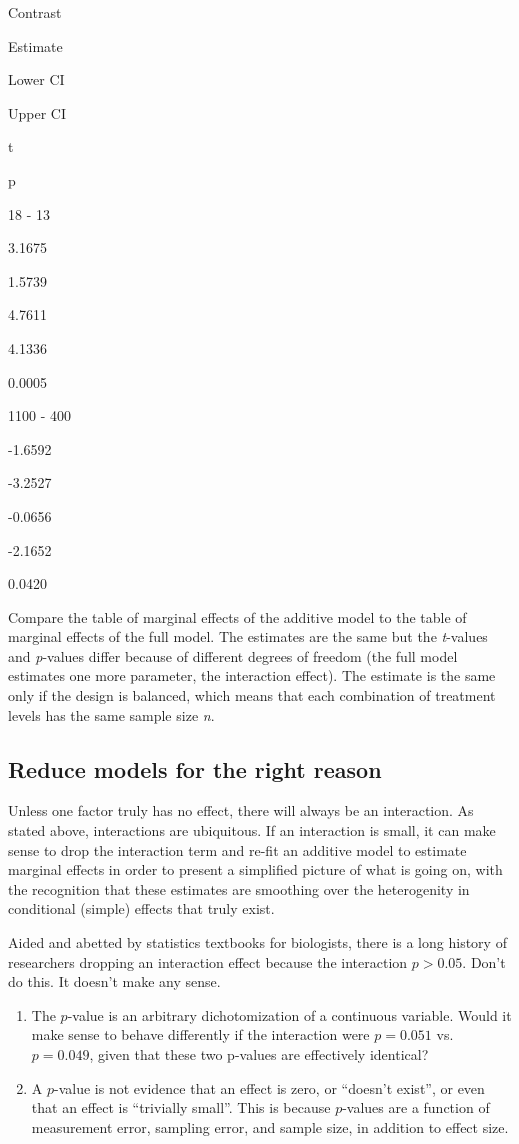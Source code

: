 \documentclass[]{book}
\providecommand{\tightlist}{%
  \setlength{\itemsep}{0pt}\setlength{\parskip}{0pt}}
\begin{document}
Contrast

Estimate

Lower CI

Upper CI

t

p

18 - 13

3.1675

1.5739

4.7611

4.1336

0.0005

1100 - 400

-1.6592

-3.2527

-0.0656

-2.1652

0.0420

Compare the table of marginal effects of the additive model to the table
of marginal effects of the full model. The estimates are the same but
the \emph{t}-values and \emph{p}-values differ because of different
degrees of freedom (the full model estimates one more parameter, the
interaction effect). The estimate is the same only if the design is
balanced, which means that each combination of treatment levels has the
same sample size \emph{n}.

\subsection{Reduce models for the right
reason}\label{reduce-models-for-the-right-reason}

Unless one factor truly has no effect, there will always be an
interaction. As stated above, interactions are ubiquitous. If an
interaction is small, it can make sense to drop the interaction term and
re-fit an additive model to estimate marginal effects in order to
present a simplified picture of what is going on, with the recognition
that these estimates are smoothing over the heterogenity in conditional
(simple) effects that truly exist.

Aided and abetted by statistics textbooks for biologists, there is a
long history of researchers dropping an interaction effect because the
interaction \(p>0.05\). Don't do this. It doesn't make any sense.

\begin{enumerate}
\def\labelenumi{\arabic{enumi}.}
\tightlist
\item
  The \(p\)-value is an arbitrary dichotomization of a continuous
  variable. Would it make sense to behave differently if the interaction
  were \(p=0.051\) vs. \(p=0.049\), given that these two p-values are
  effectively identical?
\item
  A \(p\)-value is not evidence that an effect is zero, or ``doesn't
  exist'', or even that an effect is ``trivially small''. This is
  because \(p\)-values are a function of measurement error, sampling
  error, and sample size, in addition to effect size.
\end{enumerate}
\end{document}
